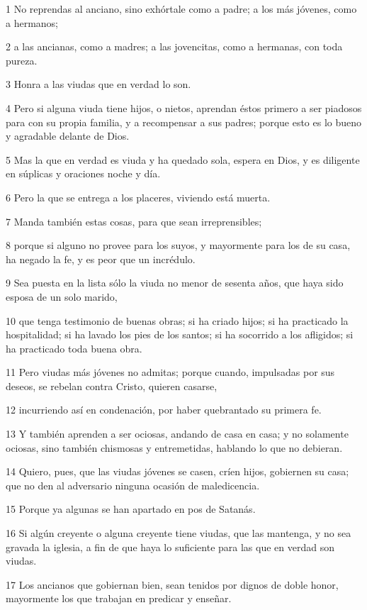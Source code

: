 \par 1 No reprendas al anciano, sino exhórtale como a padre; a los más jóvenes, como a hermanos;
\par 2 a las ancianas, como a madres; a las jovencitas, como a hermanas, con toda pureza.
\par 3 Honra a las viudas que en verdad lo son.
\par 4 Pero si alguna viuda tiene hijos, o nietos, aprendan éstos primero a ser piadosos para con su propia familia, y a recompensar a sus padres; porque esto es lo bueno y agradable delante de Dios.
\par 5 Mas la que en verdad es viuda y ha quedado sola, espera en Dios, y es diligente en súplicas y oraciones noche y día.
\par 6 Pero la que se entrega a los placeres, viviendo está muerta.
\par 7 Manda también estas cosas, para que sean irreprensibles;
\par 8 porque si alguno no provee para los suyos, y mayormente para los de su casa, ha negado la fe, y es peor que un incrédulo.
\par 9 Sea puesta en la lista sólo la viuda no menor de sesenta años, que haya sido esposa de un solo marido,
\par 10 que tenga testimonio de buenas obras; si ha criado hijos; si ha practicado la hospitalidad; si ha lavado los pies de los santos; si ha socorrido a los afligidos; si ha practicado toda buena obra.
\par 11 Pero viudas más jóvenes no admitas; porque cuando, impulsadas por sus deseos, se rebelan contra Cristo, quieren casarse,
\par 12 incurriendo así en condenación, por haber quebrantado su primera fe.
\par 13 Y también aprenden a ser ociosas, andando de casa en casa; y no solamente ociosas, sino también chismosas y entremetidas, hablando lo que no debieran.
\par 14 Quiero, pues, que las viudas jóvenes se casen, críen hijos, gobiernen su casa; que no den al adversario ninguna ocasión de maledicencia.
\par 15 Porque ya algunas se han apartado en pos de Satanás.
\par 16 Si algún creyente o alguna creyente tiene viudas, que las mantenga, y no sea gravada la iglesia, a fin de que haya lo suficiente para las que en verdad son viudas.
\par 17 Los ancianos que gobiernan bien, sean tenidos por dignos de doble honor, mayormente los que trabajan en predicar y enseñar.
